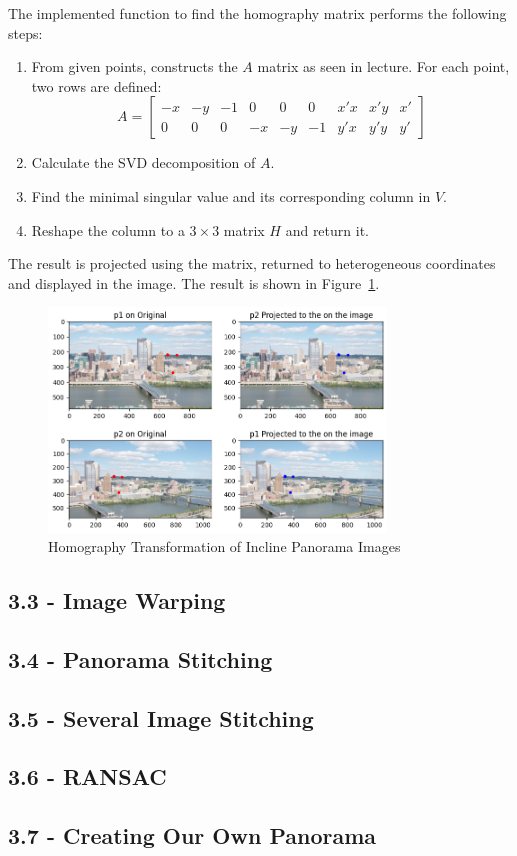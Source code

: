 \documentclass{article}
\begin{document}
The implemented function to find the homography matrix performs the following steps:
\begin{enumerate}
    \item From given points, constructs the $A$ matrix as seen in lecture. For each point, two rows are defined:
    \[ A = 
    \begin{bmatrix}
        -x & -y & -1 & 0 & 0 & 0 & x'x & x'y & x' \\
        0 & 0 & 0 & -x & -y & -1 & y'x & y'y & y'
    \end{bmatrix}
    \]
    \item Calculate the SVD decomposition of $A$.
    \item Find the minimal singular value and its corresponding column in $V$.
    \item Reshape the column to a $3 \times 3$ matrix $H$ and return it.
\end{enumerate}

The result is projected using the matrix, returned to heterogeneous coordinates and displayed in the image. The result is shown in Figure~\ref{fig:3_2}.

\begin{figure}[h!]
    \centering
    \includegraphics[width=0.8\textwidth]{../output/3.2_incline.png}
    \caption{Homography Transformation of Incline Panorama Images}
    \label{fig:3_2}
\end{figure}

\subsection*{3.3 - Image Warping}

\subsection*{3.4 - Panorama Stitching}

\subsection*{3.5 - Several Image Stitching}

\subsection*{3.6 - RANSAC}

\subsection*{3.7 - Creating Our Own Panorama}
\end{document}
